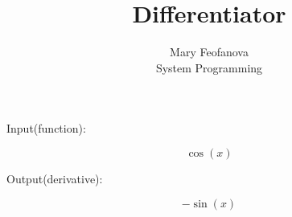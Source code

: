 \documentclass[12pt]{article}
\begin{document}
\title{Differentiator}
\author{Mary Feofanova\\
System Programming}
 
\maketitle
\begin{center}
Input(function):
\end{center}
$$\cos(x)$$
\begin{center}
Output(derivative):
\end{center}
$$-\sin(x)$$
\end{document}
